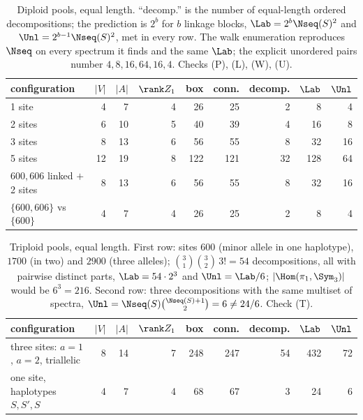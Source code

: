 \begin{table}[t]
\centering
\small
\begin{tabular}{lrrrrrrrr}
\toprule
configuration & $|V|$ & $|A|$ & $\rank Z_1$ & box & conn. & decomp. & $\Lab$ & $\Unl$\\
\midrule
1 site              &  4 &  7 & 4 &  26 &  25 &  2 &   8 &  4\\
2 sites             &  6 & 10 & 5 &  40 &  39 &  4 &  16 &  8\\
3 sites             &  8 & 13 & 6 &  56 &  55 &  8 &  32 & 16\\
5 sites             & 12 & 19 & 8 & 122 & 121 & 32 & 128 & 64\\
$600,606$ linked $+$ 2 sites & 8 & 13 & 6 & 56 & 55 & 8 & 32 & 16\\
$\{600,606\}$ vs $\{600\}$   & 4 &  7 & 4 & 26 & 25 & 2 &  8 &  4\\
\bottomrule
\end{tabular}
\caption{Diploid pools, equal length. ``decomp.'' is the number of equal-length ordered
decompositions; the prediction is $2^b$ for $b$ linkage blocks, $\Lab=2^b\Nseq(S)^2$ and
$\Unl=2^{b-1}\Nseq(S)^2$, met in every row. The walk enumeration reproduces $\Nseq$ on every
spectrum it finds and the same $\Lab$; the explicit unordered pairs number $4,8,16,64,16,4$.
Checks (P), (L), (W), (U).}
\label{ch13:tab:diploid}
\end{table}

\begin{table}[t]
\centering
\small
\begin{tabular}{lrrrrrrrr}
\toprule
configuration & $|V|$ & $|A|$ & $\rank Z_1$ & box & conn. & decomp. & $\Lab$ & $\Unl$\\
\midrule
three sites: $a=1$, $a=2$, triallelic & 8 & 14 & 7 & 248 & 247 & 54 & 432 & 72\\
one site, haplotypes $S,S',S$ & 4 & 7 & 4 & 68 & 67 & 3 & 24 & 6\\
\bottomrule
\end{tabular}
\caption{Triploid pools, equal length. First row: sites $600$ (minor allele in one haplotype),
$1700$ (in two) and $2900$ (three alleles); $\binom31\binom32\,3!=54$ decompositions, all
with pairwise distinct parts, $\Lab=54\cdot2^3$ and $\Unl=\Lab/6$; $|\Hom(\pi_1,\Sym_3)|$ would
be $6^3=216$. Second row: three decompositions with the same multiset of spectra,
$\Unl=\Nseq(S)\binom{\Nseq(S)+1}{2}=6\ne24/6$. Check (T).}
\label{ch13:tab:triploid}
\end{table}

